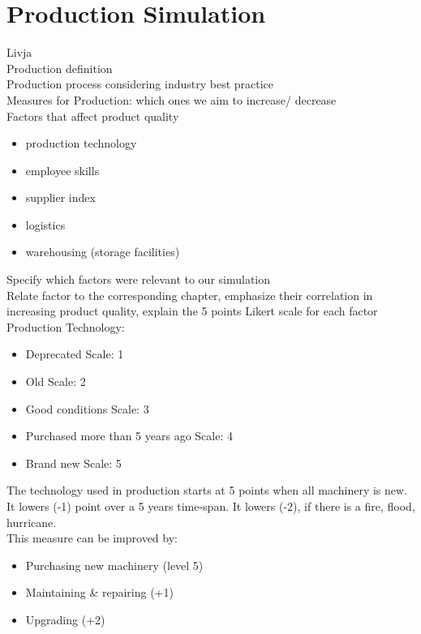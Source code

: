 \documentclass[11pt,titlepage,oneside,openany]{book}
\begin{document}






\section{Production Simulation}
\label{sec:products}
Livja \\
 Production definition \\
Production process considering industry best practice \\
Measures for Production: which ones we aim to increase/ decrease \\
 Factors that affect product quality 
\begin{itemize}
\item production technology
\item employee skills
\item supplier index
\item logistics
\item warehousing (storage facilities)
\end{itemize}
Specify which factors were relevant to our simulation \\
Relate factor to the corresponding chapter, emphasize their correlation in increasing product quality, explain the 5 points Likert scale for each factor\\
Production Technology: 
\begin{itemize}
    \item Deprecated                  Scale: 1
    \item Old                         Scale: 2
    \item Good conditions             Scale: 3
    \item Purchased more than 5 years ago Scale: 4
    \item Brand new                   Scale: 5

\end{itemize}
The technology used in production starts at 5 points when all machinery is new. It lowers (-1) point over a 5 years time-span. It lowers (-2), if there is a fire, flood, hurricane.\\
This measure can be improved by:
\begin{itemize}
    \item Purchasing new machinery (level 5)
\item Maintaining \& repairing (+1)
\item Upgrading (+2)
\end{itemize}
\end{document}
